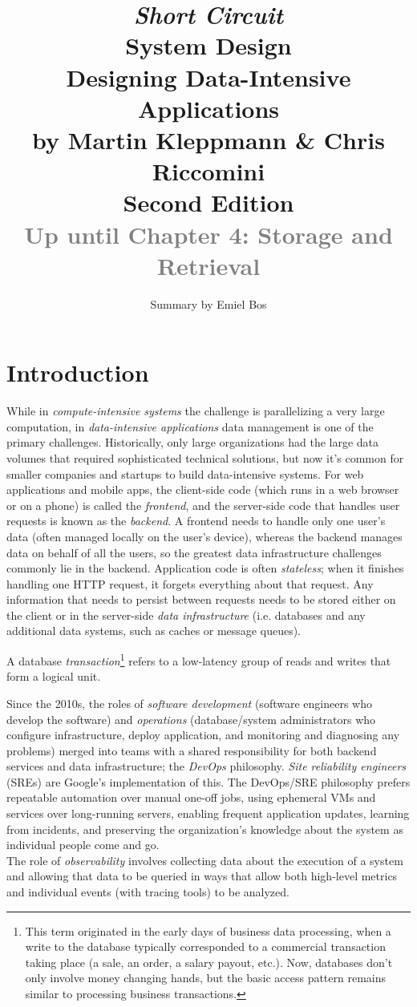 \documentclass[table, xcdraw]{article}%
\title{
\textit{Short Circuit}\\
\vspace{15px}
\huge
System Design\\
\vspace{20px}
\large
Designing Data-Intensive Applications\\
by Martin Kleppmann \& Chris Riccomini\\
Second Edition\\
\textcolor{gray}{Up until Chapter 4: Storage and Retrieval}
}
\author{Summary by Emiel Bos}
\date{}
\begin{document}
\maketitle

\section{Introduction}

While in \textit{compute-intensive systems} the challenge is parallelizing a very large computation, in \textit{data-intensive applications} data management is one of the primary challenges. Historically, only large organizations had the large data volumes that required sophisticated technical solutions, but now it's common for smaller companies and startups to build data-intensive systems. For web applications and mobile apps, the client-side code (which runs in a web browser or on a phone) is called the \textit{frontend}, and the server-side code that handles user requests is known as the \textit{backend}. A frontend needs to handle only one user’s data (often managed locally on the user's device), whereas the backend manages data on behalf of all the users, so the greatest data infrastructure challenges commonly lie in the backend. Application code is often \textit{stateless}; when it finishes handling one HTTP request, it forgets everything about that request. Any information that needs to persist between requests needs to be stored either on the client or in the server-side \textit{data infrastructure} (i.e. databases and any additional data systems, such as caches or message queues).

A database \textit{transaction}\footnote{This term originated in the early days of business data processing, when a write to the database typically corresponded to a commercial transaction taking place (a sale, an order, a salary payout, etc.). Now, databases don't only involve money changing hands, but the basic access pattern remains similar to processing business transactions.} refers to a low-latency group of reads and writes that form a logical unit.

Since the 2010s, the roles of \textit{software development} (software engineers who develop the software) and \textit{operations} (database/system administrators who configure infrastructure, deploy application, and monitoring and diagnosing any problems) merged into teams with a shared responsibility for both backend services and data infrastructure; the \textit{DevOps} philosophy. \textit{Site reliability engineers} (SREs) are Google’s implementation of this. The DevOps/SRE philosophy prefers repeatable automation over manual one-off jobs, using ephemeral VMs and services over long-running servers, enabling frequent application updates, learning from incidents, and preserving the organization’s knowledge about the system as individual people come and go.\\
The role of \textit{observability} involves collecting data about the execution of a system and allowing that data to be queried in ways that allow both high-level metrics and individual events (with tracing tools) to be analyzed.
\end{document}
